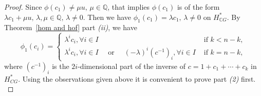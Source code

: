 \documentclass{amsart}
\newcommand{\thmref}[1]{Theorem~\ref{#1}}
\begin{document}
\begin{proof}
		
		
		Since $\phi(c_1)\neq \mu u, \, \mu \in \mathbb{Q}$, that implies $\phi(c_1)$ is of the form $\lambda c_1+\mu u,\, \lambda,\mu \in \mathbb{Q}, \, \lambda \neq 0$. Then we have $\phi_1(c_1) = \lambda c_1,\, \lambda\neq 0$ on $H^*_{\mathbb{C}G}$.  By \thmref{hom and hof} %
part \textit{(ii)}, we have 
		\begin{equation}\label{phi_1}
			\phi_1(c_i) = \begin{cases}
				\lambda^i c_i,   \forall i \in I& \text{ if } k<n-k,\\
				\lambda^i c_i,  \forall i \in I \quad \text{ or } \quad(-\lambda)^i (c^{-1})_i,    \forall i \in I & \text{ if } k= n-k,
			\end{cases}
		\end{equation} where %
$ (c^{-1})_i $ is the $ 2i $-dimensional part of the inverse of $ c = 1 + c_1 + \cdots + c_k $ in $ H^*_{ CG} $. Using the observations given above it is convenient to prove %
part \textit{(2)} first. \\
		

\end{proof}
\end{document}
